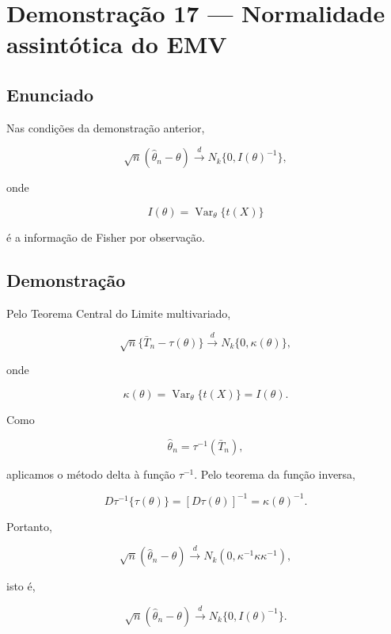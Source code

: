 \documentclass[
  letterpaper,
  DIV=11,
  numbers=noendperiod]{scrreprt}
\begin{document}
\section*{Demonstração 17 --- Normalidade assintótica do
EMV}\label{demonstrauxe7uxe3o-17-normalidade-assintuxf3tica-do-emv}


\subsection*{Enunciado}\label{enunciado-12}

Nas condições da demonstração anterior,

\[
\sqrt n(\widehat\theta_n-\theta)
\xrightarrow{d}
N_k\{0,I(\theta)^{-1}\},
\]

onde

\[
I(\theta)=\operatorname{Var}_\theta\{t(X)\}
\]

é a informação de Fisher por observação.

\subsection*{Demonstração}\label{demonstrauxe7uxe3o-13}

Pelo Teorema Central do Limite multivariado,

\[
\sqrt n\{\bar T_n-\tau(\theta)\}
\xrightarrow{d}
N_k\{0,\kappa(\theta)\},
\]

onde

\[
\kappa(\theta)
=
\operatorname{Var}_\theta\{t(X)\}
=
I(\theta).
\]

Como

\[
\widehat\theta_n=\tau^{-1}(\bar T_n),
\]

aplicamos o método delta à função \(\tau^{-1}\). Pelo teorema da função
inversa,

\[
D\tau^{-1}\{\tau(\theta)\}
=
[D\tau(\theta)]^{-1}
=
\kappa(\theta)^{-1}.
\]

Portanto,

\[
\sqrt n(\widehat\theta_n-\theta)
\xrightarrow{d}
N_k\left(
0,
\kappa^{-1}\kappa\kappa^{-1}
\right),
\]

isto é,

\[
\sqrt n(\widehat\theta_n-\theta)
\xrightarrow{d}
N_k\{0,I(\theta)^{-1}\}.
\]
\end{document}
